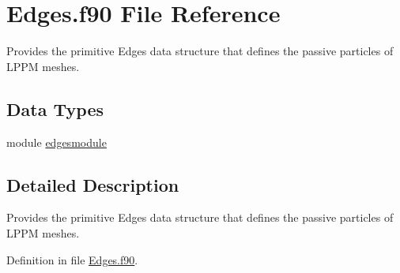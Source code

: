 \hypertarget{Edges_8f90}{\section{Edges.\+f90 File Reference}
\label{Edges_8f90}
}


Provides the primitive Edges data structure that defines the passive particles of L\+P\+P\+M meshes.  


\subsection*{Data Types}
\begin{DoxyCompactItemize}
\item 
module \hyperlink{classedgesmodule}{edgesmodule}
\end{DoxyCompactItemize}


\subsection{Detailed Description}
Provides the primitive Edges data structure that defines the passive particles of L\+P\+P\+M meshes. 



Definition in file \hyperlink{Edges_8f90_source}{Edges.\+f90}.

